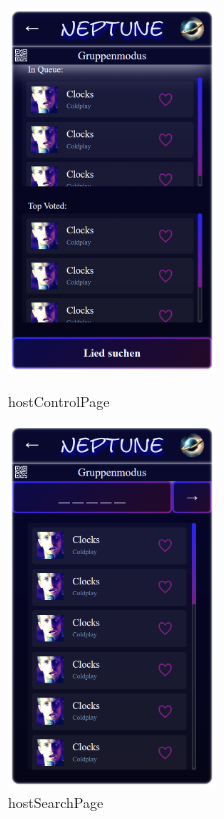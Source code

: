 \documentclass[oneside, ngerman]{sdqtechreport}
\begin{document}
\begin{figure}
   \begin{minipage}[b]{.4\linewidth} %
      \includegraphics[width=5.5cm]{LATEX/Pflichtenheft/GraphicDesigns/hostControlPage.png}
      \caption{hostControlPage}
   \end{minipage}
   \hspace{2cm}%
   \begin{minipage}[b]{.4\linewidth} %
      \includegraphics[width=5.5cm]{LATEX/Pflichtenheft/GraphicDesigns/hostSearchPage.png}
      \caption{hostSearchPage}
   \end{minipage}
\end{figure}
\end{document}
